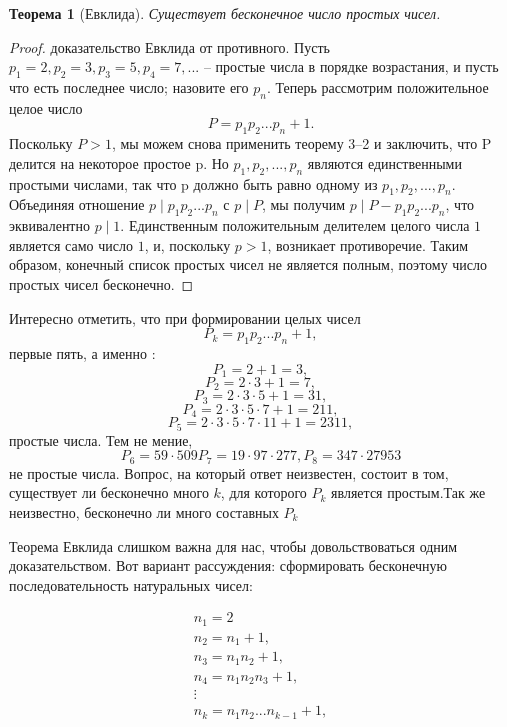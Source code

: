 \documentclass[11pt]{article}
\newtheorem{theorem}{Теорема}
\begin{document}
\begin{theorem}[Евклида]
\label{th3-4}
Существует бесконечное число простых чисел.
\end{theorem}
\begin{proof}
	доказательство Евклида от противного. Пусть ${p_{1} = 2, p_{2} = 3, p _{3} = 5, p_{4} = 7,...}$ -- простые числа в порядке возрастания, и пусть что есть последнее число; назовите его $p_{n}$. Теперь рассмотрим положительное целое число \[P = p_{1}p_{2}...p_{n} + 1.\] Поскольку $P > 1$, мы можем снова применить теорему 3--2 и заключить, что P делится на некоторое простое p. Но $p_{1},p_{2},...,p_{n}$ являются единственными простыми числами, так что p должно быть равно одному из $p_{1},p_{2},...,p_{n}$. Объединяя отношение $p\mid p_{1}p_{2}...p_{n}$ с $p\mid P$, мы получим  $p\mid P - p_{1}p_{2}...p_{n}$, что эквивалентно $p\mid 1$. Единственным положительным делителем целого числа $1$ является само число $1$, и, поскольку $p > 1$, возникает противоречие. Таким образом, конечный список простых чисел не является полным, поэтому число простых чисел бесконечно.
	\end{proof}

\thispagestyle{fancy}
\rhead{\thepage}

Интересно отметить, что при формировании целых чисел \[P_{k} = p_{1}p_{2}...p_{n} + 1,\] первые пять, а именно : \[P_{1} = 2 + 1 = 3,\] 
\[P_{2} = 2\cdot3 + 1 = 7,\] \[P_{3} = 2\cdot3\cdot5 + 1 = 31,\] \[P_{4} = 2\cdot3\cdot5\cdot7 + 1 = 211,\]\[P_{5} = 2\cdot3\cdot5\cdot7\cdot11 + 1 = 2311,\] простые числа. Тем не мение, \[P_{6} = 59\cdot509 P_{7} = 19\cdot97\cdot277, P_{8} = 347\cdot27953\] не простые числа. Вопрос, на который ответ неизвестен, состоит в том, существует ли бесконечно много $k$, для которого $P_{k}$ является простым.Так же неизвестно, бесконечно ли много составных $P_{k}$

Теорема Евклида слишком важна для нас, чтобы довольствоваться одним доказательством. Вот вариант рассуждения: сформировать бесконечную последовательность натуральных чисел:

\begin{gather*} 
n_{1} = 2\\
n_{2} = n_{1} + 1,\\
n_{3} = n_{1}n_{2} + 1,\\
n_{4} = n_{1}n_{2}n_{3} + 1,\\
\vdots\\
n_{k} = n_{1}n_{2}...n_{k-1} + 1,\\
\end{gather*}
\end{document}
